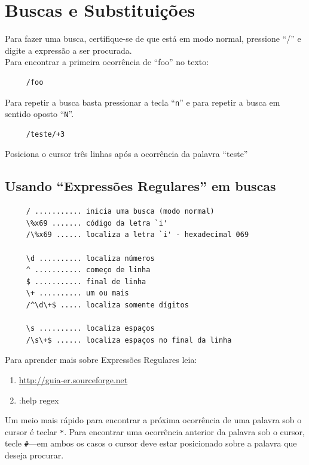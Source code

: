 \documentclass[10pt,a4paper,openany]{book}
\begin{document}
\chapter{Buscas e Substituições}\label{Buscas e substituições}

Para fazer uma busca, certifique-se de que está em modo normal,
pressione ``/'' e digite a expressão a ser procurada. \\


Para encontrar a primeira ocorrência de ``foo'' no texto:

\begin{verbatim}
     /foo
\end{verbatim}

Para repetir a busca basta pressionar a tecla ``\verb+n+'' e para
repetir a busca em sentido oposto ``\verb+N+''.

\begin{verbatim}
     /teste/+3
\end{verbatim}

Posiciona o cursor três linhas após a ocorrência da palavra ``teste'' \\


\section{Usando ``Expressões Regulares'' em buscas}

\begin{verbatim}
     / ........... inicia uma busca (modo normal)
     \%x69 ....... código da letra `i'
     /\%x69 ...... localiza a letra `i' - hexadecimal 069
     
     \d .......... localiza números
     ^ ........... começo de linha
     $ ........... final de linha
     \+ .......... um ou mais
     /^\d\+$ ..... localiza somente dígitos
     
     \s .......... localiza espaços
     /\s\+$ ...... localiza espaços no final da linha 
\end{verbatim}

Para aprender mais sobre Expressões Regulares leia:

\begin{enumerate}
  \item \url{http://guia-er.sourceforge.net}
  \item :help regex
\end{enumerate}

Um meio mais rápido para encontrar a próxima ocorrência de uma palavra sob o
cursor é teclar \verb|*|. Para encontrar uma ocorrência anterior da palavra
sob o cursor, tecle \verb|#|---em ambos os casos o cursor deve estar
posicionado sobre a palavra que deseja procurar.
\end{document}
